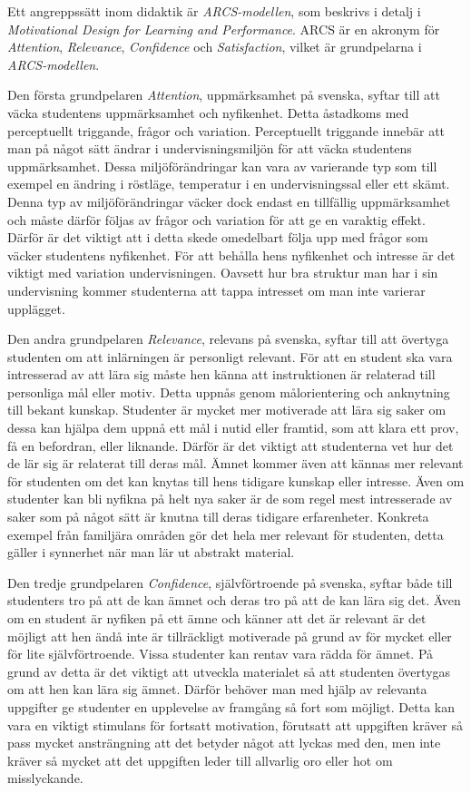 \documentclass[]{article}
\begin{document}
Ett angreppssätt inom didaktik är \textit{ARCS-modellen},
som beskrivs i detalj i
\textit{Motivational Design for Learning and Performance}.
ARCS är en akronym för \textit{Attention}, \textit{Relevance},
\textit{Confidence} och \textit{Satisfaction}, vilket är grundpelarna
i \textit{ARCS-modellen}.

Den första grundpelaren \textit{Attention}, uppmärksamhet på svenska,
syftar till att väcka studentens uppmärksamhet och nyfikenhet.
Detta åstadkoms med perceptuellt triggande, frågor och variation.
Perceptuellt triggande innebär att man på något sätt ändrar i
undervisningsmiljön för att väcka studentens uppmärksamhet.
Dessa miljöförändringar kan vara av varierande typ som till exempel en ändring
i röstläge, temperatur i en undervisningssal eller ett skämt.
Denna typ av miljöförändringar väcker dock endast en tillfällig uppmärksamhet
och måste därför följas av frågor och variation för att ge en varaktig effekt.
Därför är det viktigt att i detta skede omedelbart följa upp med frågor som väcker
studentens nyfikenhet. För att behålla hens nyfikenhet och
intresse är det viktigt med variation undervisningen.
Oavsett hur bra struktur man har i sin undervisning kommer studenterna att tappa
intresset om man inte varierar upplägget.

Den andra grundpelaren \textit{Relevance}, relevans på svenska,
syftar till att övertyga studenten om att inlärningen är personligt relevant.
För att en student ska vara intresserad av att lära sig måste hen känna
att instruktionen är relaterad till personliga mål eller motiv.
Detta uppnås genom målorientering och anknytning till bekant kunskap.
Studenter är mycket mer motiverade att lära sig saker om dessa kan hjälpa dem
uppnå ett mål i nutid eller framtid, som att klara ett prov, få en befordran,
eller liknande. Därför är det viktigt att studenterna vet hur det de lär sig är
relaterat till deras mål. Ämnet kommer även att kännas mer relevant för studenten
om det kan knytas till hens tidigare kunskap eller intresse. Även om studenter kan
bli nyfikna på helt nya saker är de som regel mest intresserade av saker som på
något sätt är knutna till deras tidigare erfarenheter.
Konkreta exempel från familjära områden gör det hela mer relevant för studenten,
detta gäller i synnerhet när man lär ut abstrakt material.

Den tredje grundpelaren \textit{Confidence}, självförtroende på svenska,
syftar både till studenters tro på att de kan ämnet och deras tro på att
de kan lära sig det. Även om en student är nyfiken på ett ämne och känner
att det är relevant är det möjligt att hen ändå inte är tillräckligt
motiverade på grund av för mycket eller för lite självförtroende.
Vissa studenter kan rentav vara rädda för ämnet. På grund av detta är det
viktigt att utveckla materialet så att studenten övertygas om att hen kan
lära sig ämnet. Därför behöver man med hjälp av relevanta uppgifter ge studenter
en upplevelse av framgång så fort som möjligt. Detta kan vara en viktigt
stimulans för fortsatt motivation, förutsatt att uppgiften kräver så pass
mycket ansträngning att det betyder något att lyckas med den, men inte kräver
så mycket att det uppgiften leder till allvarlig oro eller hot om misslyckande.
\end{document}
